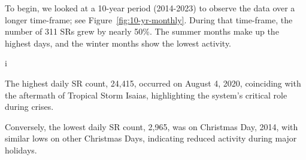 \documentclass[12pt, titlepage]{article}
\begin{document}
To begin, we looked at a 10-year period (2014-2023) to
observe the data over a longer time-frame; see
Figure~\ref{fig:10-yr-monthly}. During that time-frame,
the number of 311 SRs grew by nearly 50\%. The summer months make
up the highest days, and the winter months show the lowest activity.

i%

The highest daily SR count, 24,415, occurred on
August 4, 2020, coinciding with the aftermath of Tropical Storm
Isaias, highlighting the system's critical role during crises.


Conversely, the lowest daily SR count, 2,965, was on Christmas Day,
2014, with similar lows on other Christmas Days, indicating reduced
activity during major holidays.



\end{document}
